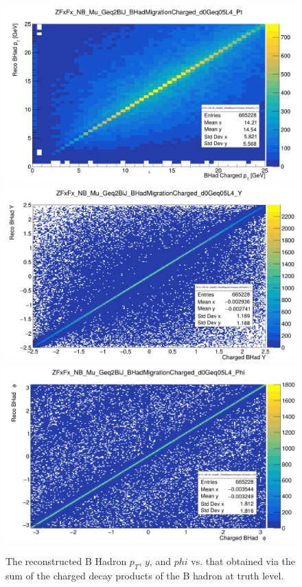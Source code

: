 \documentclass[10pt,a4paper]{book}
\begin{document}
\begin{figure}
    \centering
    \includegraphics[width=0.9\linewidth]{analysis-chapter/pflowMig_pt.png}
    \includegraphics[width=0.9\linewidth]{analysis-chapter/pflowMig_y.png}
    \includegraphics[width=0.9\linewidth]{analysis-chapter/pflowMig_phi.png}
    \caption{The reconstructed B Hadron $p_T$, $y$, and $phi$ vs. that obtained via the sum of the charged decay products of the B hadron at truth level.}
    \label{chargedMigration}
\end{figure}
\end{document}
